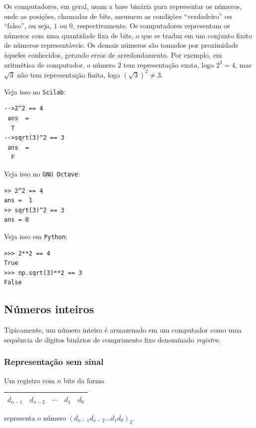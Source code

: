 Os computadores, em geral, usam a base binária para representar os números, onde as posições, chamadas de bits, assumem as condições ``verdadeiro'' ou ``falso'', ou seja, $1$ ou $0$, respectivamente. Os computadores representam os números com uma quantidade fixa de bits, o que se traduz em um conjunto finito de números representáveis. Os demais números são tomados por proximidade àqueles conhecidos, gerando erros de arredondamento. Por exemplo, em aritmética de computador, o número $2$ tem representação exata, logo $2^2=4$, mas $\sqrt{3}$ não tem representação finita, logo $(\sqrt{3})^2\neq 3$.

\ifisscilab
Veja isso no \verb+Scilab+:
\begin{verbatim}
-->2^2 == 4
 ans  =
  T
-->sqrt(3)^2 == 3
 ans  =
  F
\end{verbatim}
\fi
\ifisoctave
Veja isso no \verb+GNU Octave+:
\begin{verbatim}
>> 2^2 == 4
ans =  1
>> sqrt(3)^2 == 3
ans = 0
\end{verbatim}
\fi
\ifispython
Veja isso em \verb+Python+:
\begin{verbatim}
>>> 2**2 == 4
True
>>> np.sqrt(3)**2 == 3
False
\end{verbatim}
\fi

\subsection{Números inteiros}

Tipicamente, um número inteiro é armazenado em um computador como uma sequência de dígitos binários de comprimento fixo denominado \emph{registro}.

\subsubsection{Representação sem sinal}
Um registro com $n$ bits da forma
 \begin{center}
   \begin{tabular}{|c|c|c|c|c|}\hline
     $d_{n-1}$ & $d_{n-2}$ & $\cdots$ & $d_1$ & $d_0$\\\hline
   \end{tabular}
 \end{center}
representa o número $(d_{n-1}d_{n-2}...d_1d_0)_2$.

